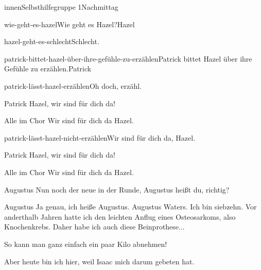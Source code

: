 \documentclass[12pt]{article}
\begin{document}
\begin{scene}[cut to]{innen}{Selbsthilfegruppe 1}{Nachmittag}
\begin{decision}{wie-geht-es-hazel}{Wie geht es \gls{Hazel}?}{\gls{Hazel}}
\begin{option}{hazel-geht-es-schlecht}{Schlecht.}
\begin{decision}{patrick-bittet-hazel-über-ihre-gefühle-zu-erzählen}{\gls{Patrick} bittet \gls{Hazel} über ihre Gefühle zu erzählen.}{\gls{Patrick}}
\begin{option}{patrick-lässt-hazel-erzählen}{Oh doch, erzähl.}
                        \begin{dialog}{Patrick}
                            \gls{Hazel}, wir sind für dich da!
                        \end{dialog}

                        \begin{dialog}{Alle im Chor}
                            Wir sind für dich da \gls{Hazel}.
                        \end{dialog}
                    \end{option}

                    \begin{option}{patrick-lässt-hazel-nicht-erzählen}{Wir sind für dich da, \gls{Hazel}.}
                        \begin{dialog}{Patrick}
                            \gls{Hazel}, wir sind für dich da!
                        \end{dialog}

                        \begin{dialog}{Alle im Chor}
                            Wir sind für dich da \gls{Hazel}.
                        \end{dialog}
                    \end{option}
                \end{decision}
            \end{option}
        \end{decision}

        \begin{dialog}{Augustus}
            Nun noch der neue in der Runde, Augustus heißt du, richtig?
        \end{dialog}

        \begin{dialog}{Augustus}
            Ja genau, ich heiße Augustus.
            Augustus Waters.
            Ich bin siebzehn.
            Vor anderthalb Jahren hatte ich den leichten Anflug eines Osteosarkoms, also Knochenkrebs.
            Daher habe ich auch diese Beinprothese...


            So kann man ganz einfach ein paar Kilo abnehmen!

            Aber heute bin ich hier, weil \gls{Isaac} mich darum gebeten hat.
        \end{dialog}


\end{scene}
\end{document}
